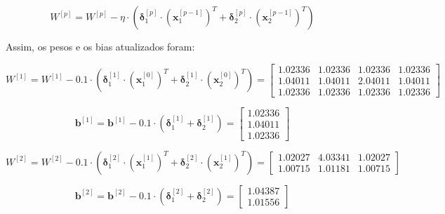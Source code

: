 \documentclass[a4paper,12pt]{article} %
\begin{document}
\begin{enumerate}
\begin{equation}
    W^{[p]} = W^{[p]} - \eta \cdot (\bm{\delta}^{[p]}_1 \cdot (\textbf{x}^{[p-1]}_1)^T + \bm{\delta}^{[p]}_2 \cdot (\textbf{x}^{[p-1]}_2)^T)
\end{equation}

Assim, os pesos e os bias atualizados foram:

\begin{equation*}
    W^{[1]} = W^{[1]} - 0.1 \cdot (\bm{\delta}^{[1]}_1 \cdot (\textbf{x}^{[0]}_1)^T + \bm{\delta}^{[1]}_2 \cdot (\textbf{x}^{[0]}_2)^T) = \begin{bmatrix} 1.02336 & 1.02336 & 1.02336 & 1.02336 \\
                                                                                                                            1.04011 & 1.04011 & 2.04011 & 1.04011 \\
                                                                                                                            1.02336 & 1.02336 & 1.02336 & 1.02336 \end{bmatrix}
\end{equation*}

\begin{equation*}
    \textbf{b}^{[1]} = \textbf{b}^{[1]} - 0.1 \cdot (\bm{\delta}^{[1]}_1 + \bm{\delta}^{[1]}_2) = \begin{bmatrix} 1.02336 \\ 1.04011 \\ 1.02336 \end{bmatrix}
\end{equation*}

\begin{equation*}
    W^{[2]} = W^{[2]} - 0.1 \cdot (\bm{\delta}^{[2]}_1 \cdot (\textbf{x}^{[1]}_1)^T + \bm{\delta}^{[2]}_2 \cdot (\textbf{x}^{[1]}_2)^T) = \begin{bmatrix} 1.02027 & 4.03341 & 1.02027 \\
                                                                                                                            1.00715 & 1.01181 & 1.00715 \end{bmatrix}
\end{equation*}

\begin{equation*}
    \textbf{b}^{[2]} = \textbf{b}^{[2]} - 0.1 \cdot (\bm{\delta}^{[2]}_1 + \bm{\delta}^{[2]}_2) = \begin{bmatrix} 1.04387 \\ 1.01556 \end{bmatrix}
\end{equation*}


\end{enumerate}
\end{document}
